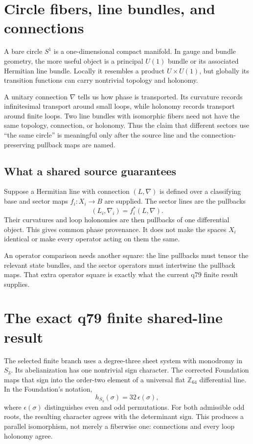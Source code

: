 \documentclass[11pt]{article}
\begin{document}
\section{Circle fibers, line bundles, and connections}

A bare circle \(S^1\) is a one-dimensional compact manifold. In gauge and
bundle geometry, the more useful object is a principal \(U(1)\) bundle or its
associated Hermitian line bundle. Locally it resembles a product
\(U\times U(1)\), but globally its transition functions can carry nontrivial
topology and holonomy.

A unitary connection \(\nabla\) tells us how phase is transported. Its
curvature records infinitesimal transport around small loops, while holonomy
records transport around finite loops. Two line bundles with isomorphic
fibers need not have the same topology, connection, or holonomy. Thus the
claim that different sectors use ``the same circle'' is meaningful only after
the source line and the connection-preserving pullback maps are named.

\subsection{What a shared source guarantees}

Suppose a Hermitian line with connection \((L,\nabla)\) is defined over a
classifying base and sector maps \(f_i:X_i\to B\) are supplied. The sector
lines are the pullbacks
\[
 (L_i,\nabla_i)=f_i^*(L,\nabla).
\]
Their curvatures and loop holonomies are then pullbacks of one differential
object. This gives common phase provenance. It does not make the spaces
\(X_i\) identical or make every operator acting on them the same.

An operator comparison needs another square: the line pullbacks must tensor
the relevant state bundles, and the sector operators must intertwine the
pullback maps. That extra operator square is exactly what the current q79
finite result supplies.

\section{The exact q79 finite shared-line result}

The selected finite branch uses a degree-three sheet system with monodromy in
\(S_3\). Its abelianization has one nontrivial sign character. The corrected
Foundation maps that sign into the order-two element of a universal flat
\(\mathbb Z_{64}\) differential line. In the Foundation's notation,
\[
 h_{S_3}(\sigma)=32\,\epsilon(\sigma),
\]
where \(\epsilon(\sigma)\) distinguishes even and odd permutations. For both
admissible odd roots, the resulting character agrees with the determinant
sign. This produces a parallel isomorphism, not merely a fiberwise one:
connections and every loop holonomy agree.
\end{document}
